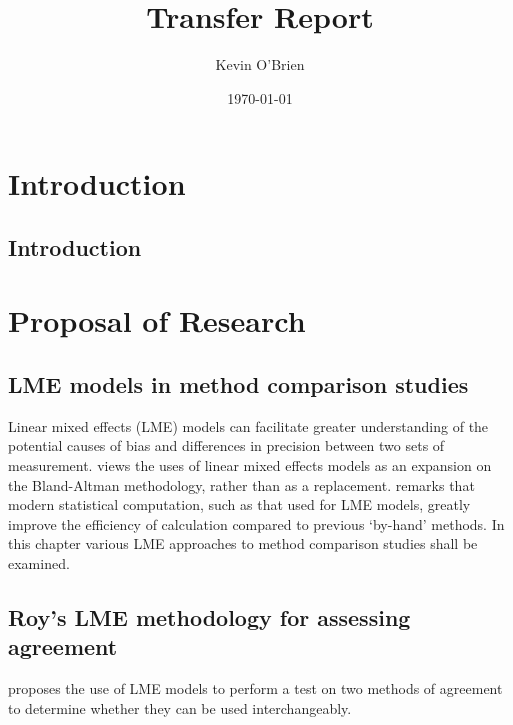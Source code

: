 \documentclass[12pt, a4paper]{report}
\begin{document}
\author{Kevin O'Brien}
\title{Transfer Report}
\date{\today}
\maketitle

\tableofcontents \setcounter{tocdepth}{2}

\newpage
\chapter{Introduction}

\section{Introduction}

\chapter{Proposal of Research}



\section{LME models in method comparison studies}

Linear mixed effects (LME) models can facilitate greater
understanding of the potential causes of bias and differences in
precision between two sets of measurement. \citet{LaiShiao} views
the uses of linear mixed effects models as an expansion on the
Bland-Altman methodology, rather than as a replacement.
\citet{BXC2008} remarks that modern statistical computation, such
as that used for LME models, greatly improve the efficiency of
calculation compared to previous `by-hand' methods. In this
chapter various LME approaches to method comparison studies shall
be examined.

\newpage

\section{Roy's LME methodology for assessing agreement}

\citet{ARoy2009} proposes the use of LME models to perform a test
on two methods of agreement to determine whether they can be used
interchangeably.
\end{document}
